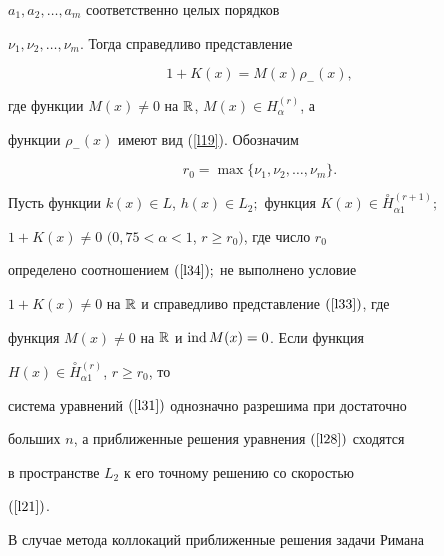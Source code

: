 $a_1,a_2,\dotsc,a_m$ соответственно целых порядков


$\nu_1,\nu_2,\dotsc,\nu_m$. Тогда справедливо представление


\begin{equation}


\label{l33} 1+K(x)=M(x)\rho_-(x),


\end{equation}


где функции $M(x)\neq 0$ на $\Bbb R$, $M(x)\in H_\alpha^{(r)}$, а


функции $\rho_-(x)$ имеют вид (\ref{l19}). Обозначим


\begin{equation}


\label{l34} r_0=\max  \{\nu_1,\nu_2,\dotsc,\nu_m\}.


\end{equation}








\begin{thm}


Пусть функции $k(x)\in L$, $h(x) \in


L_2;$ функция $K(x) \in \overset{\circ}{H}{}^{(r+1)}_{\alpha1};$


$1+K(x)\neq 0$ $(0{,}75<\alpha<1$, $r\geqslant r_0)$, где число $r_0$


определено соотношением $(\ref{l34});$ не выполнено условие


$1+K(x)\neq 0$ на $\Bbb R$ и справедливо представление $(\ref{l33})$, где


функция $M(x)\neq 0$ на $\Bbb R$ и $\operatorname{ind}  M(x)=0$. Если функция


$H(x)\in\overset{\circ}{H}{}^{(r)}_{\alpha1}$, $r\geqslant r_0$, то


система уравнений $(\ref{l31})$ однозначно разрешима при достаточно


больших $n$, а приближенные решения уравнения $(\ref{l28})$ сходятся


в пространстве $L_2$ к его точному решению со скоростью


$(\ref{l21})$.


\end{thm}








В случае метода коллокаций приближенные решения задачи Римана


